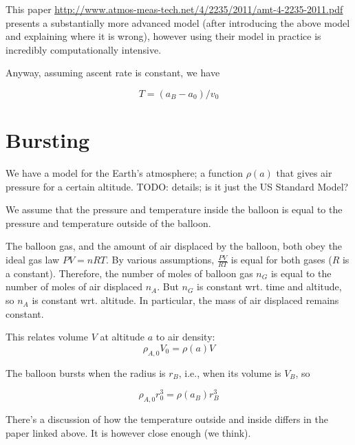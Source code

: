 \documentclass{article}
\begin{document}
This paper \underline{\url{http://www.atmos-meas-tech.net/4/2235/2011/amt-4-2235-2011.pdf}} presents
a substantially more advanced model (after introducing the above model and explaining
where it is wrong), however using their model in practice is incredibly computationally
intensive.

Anyway, assuming ascent rate is constant, we have

\[  T = (a_B - a_0) / v_0 \]

\section{Bursting}

We have a model for the Earth's atmosphere; a function $\rho(a)$ that gives
air pressure for a certain altitude.
TODO: details; is it just the US Standard Model?

We assume that the pressure and temperature inside the balloon is equal
to the pressure and temperature outside of the balloon.

The balloon gas, and the amount of air displaced by the balloon, both
obey the ideal gas law $PV=nRT$. By various assumptions, $\frac{PV}{RT}$ is
equal for both gases ($R$ is a constant).
Therefore, the number of moles of balloon gas $n_G$ is equal to the number
of moles of air displaced $n_A$. But $n_G$ is constant wrt. time and altitude,
so $n_A$ is constant wrt. altitude. In particular, the mass of air displaced
remains constant.

This relates volume $V$ at altitude $a$ to air density: 
\[
    \rho_{A,0} V_0 = \rho(a) V
\]

The balloon bursts when the radius is $r_B$, i.e., when its volume is $V_B$, so

\[
    \rho_{A,0} r_0^3 = \rho(a_B) r_B^3
\]

There's a discussion of how the temperature outside and inside differs in
the paper linked above. It is however close enough (we think).
\end{document}
